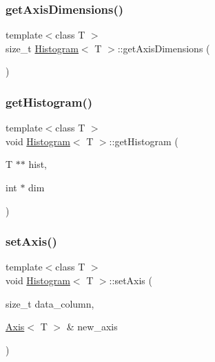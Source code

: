 \mbox{\label{class_histogram_a7637302e53db8b91576304f663ecc932}} 
\subsubsection{\texorpdfstring{get\+Axis\+Dimensions()}{getAxisDimensions()}}
{\footnotesize\ttfamily template$<$class T $>$ \\
size\+\_\+t \hyperlink{class_histogram}{Histogram}$<$ T $>$\+::get\+Axis\+Dimensions (\begin{DoxyParamCaption}{ }\end{DoxyParamCaption})\hspace{0.3cm}{\ttfamily [inline]}}

\mbox{\label{class_histogram_ae74962acd836b01d1178b83d9aa99550}} 
\subsubsection{\texorpdfstring{get\+Histogram()}{getHistogram()}}
{\footnotesize\ttfamily template$<$class T $>$ \\
void \hyperlink{class_histogram}{Histogram}$<$ T $>$\+::get\+Histogram (\begin{DoxyParamCaption}\item[{T $\ast$$\ast$}]{hist,  }\item[{int $\ast$}]{dim }\end{DoxyParamCaption})\hspace{0.3cm}{\ttfamily [inline]}}

\mbox{\label{class_histogram_a23cf33ed2f5c3d0833d32c7dd0209370}} 
\subsubsection{\texorpdfstring{set\+Axis()}{setAxis()}\hspace{0.1cm}{\footnotesize\ttfamily [1/2]}}
{\footnotesize\ttfamily template$<$class T $>$ \\
void \hyperlink{class_histogram}{Histogram}$<$ T $>$\+::set\+Axis (\begin{DoxyParamCaption}\item[{size\+\_\+t}]{data\+\_\+column,  }\item[{\hyperlink{class_axis}{Axis}$<$ T $>$ \&}]{new\+\_\+axis }\end{DoxyParamCaption})\hspace{0.3cm}{\ttfamily [inline]}}

